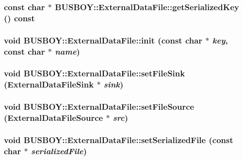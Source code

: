 \label{classBUSBOY_1_1ExternalDataFile_ab6c68b49bee602513e89349482986b50}
\hypertarget{classBUSBOY_1_1ExternalDataFile_a34f7faba7fc314c934b67f2276e39ee9}{
\subsubsection[{getSerializedKey}]{\setlength{\rightskip}{0pt plus 5cm}const char $\ast$ BUSBOY::ExternalDataFile::getSerializedKey () const}}
\label{classBUSBOY_1_1ExternalDataFile_a34f7faba7fc314c934b67f2276e39ee9}
\hypertarget{classBUSBOY_1_1ExternalDataFile_a6a06510ed364868f84d68cbc31280143}{
\subsubsection[{init}]{\setlength{\rightskip}{0pt plus 5cm}void BUSBOY::ExternalDataFile::init (const char $\ast$ {\em key}, \/  const char $\ast$ {\em name})}}
\label{classBUSBOY_1_1ExternalDataFile_a6a06510ed364868f84d68cbc31280143}
\hypertarget{classBUSBOY_1_1ExternalDataFile_ab4f4f9709e435999a17d74774ebb898d}{
\subsubsection[{setFileSink}]{\setlength{\rightskip}{0pt plus 5cm}void BUSBOY::ExternalDataFile::setFileSink ({\bf ExternalDataFileSink} $\ast$ {\em sink})}}
\label{classBUSBOY_1_1ExternalDataFile_ab4f4f9709e435999a17d74774ebb898d}
\hypertarget{classBUSBOY_1_1ExternalDataFile_a134d84d94fc581a282b43cc7531284d6}{
\subsubsection[{setFileSource}]{\setlength{\rightskip}{0pt plus 5cm}void BUSBOY::ExternalDataFile::setFileSource ({\bf ExternalDataFileSource} $\ast$ {\em src})}}
\label{classBUSBOY_1_1ExternalDataFile_a134d84d94fc581a282b43cc7531284d6}
\hypertarget{classBUSBOY_1_1ExternalDataFile_abfc6794d41f9bbfaa93b4abee71a98e6}{
\subsubsection[{setSerializedFile}]{\setlength{\rightskip}{0pt plus 5cm}void BUSBOY::ExternalDataFile::setSerializedFile (const char $\ast$ {\em serializedFile})}}
\label{classBUSBOY_1_1ExternalDataFile_abfc6794d41f9bbfaa93b4abee71a98e6}


